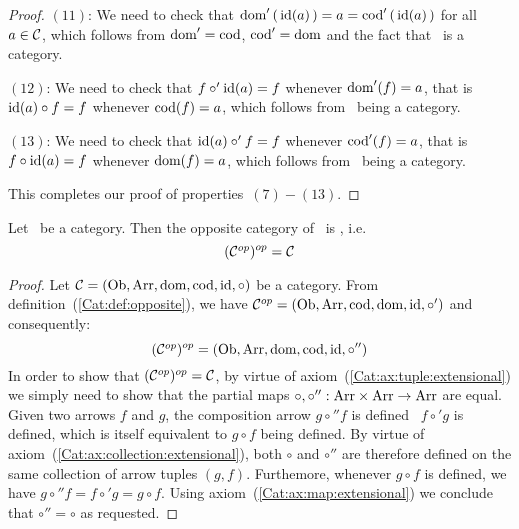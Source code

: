 \begin{proof}
    $(11)$: We need to check that $\mbox{\rm dom}'\,(\,\mbox{\rm id}(a)\,) = a = \mbox{\rm cod}'
    \,(\,\mbox{\rm id}(a)\,)$ for all $a\in\mbox{$\cal C$}$, which follows from $\mbox{\rm dom}'=\mbox{\rm cod}$,
    $\mbox{\rm cod}'=\mbox{\rm dom}$ and the fact that \Cat\ is a category.

    $(12)$: We need to check that $f\circ'\mbox{\rm id}(a)=f$ whenever $\mbox{\rm dom}'(f)=a$,
    that is $\mbox{\rm id}(a)\circ f=f$ whenever $\mbox{\rm cod}(f)=a$, which follows from
    \Cat\ being a category.

    $(13)$: We need to check that $\mbox{\rm id}(a)\circ' f=f$ whenever $\mbox{\rm cod}'(f)=a$,
    that is $f\circ\mbox{\rm id}(a)=f$ whenever $\mbox{\rm dom}(f)=a$, which follows from
    \Cat\ being a category.

    \noindent
    This completes our proof of properties~$(7)-(13)$.
\end{proof}

\begin{prop}
    Let \Cat\ be a category. Then the opposite category of \Cop\ is \Cat, i.e.
        \[
            (\mbox{${\cal C}^{op}$})^{op} = \mbox{$\cal C$}
        \]
\end{prop}
\begin{proof}
    Let $\mbox{$\cal C$}=(\mbox{\rm Ob}, \mbox{\rm Arr}, \mbox{\rm dom},\mbox{\rm cod}, \mbox{\rm id}, \circ)$ be a category. From
    definition~(\ref{Cat:def:opposite}), we have
    $\mbox{${\cal C}^{op}$}=(\mbox{\rm Ob}, \mbox{\rm Arr}, \mbox{\rm cod}, \mbox{\rm dom}, \mbox{\rm id}, \circ')$ and consequently:
        \[
            (\mbox{${\cal C}^{op}$})^{op}=(\mbox{\rm Ob}, \mbox{\rm Arr}, \mbox{\rm dom}, \mbox{\rm cod}, \mbox{\rm id}, \circ'')
        \]
    In order to show that $(\mbox{${\cal C}^{op}$})^{op}=\mbox{$\cal C$}$, by virtue of 
    axiom~(\ref{Cat:ax:tuple:extensional}) we simply need to show that
    the partial maps $\circ,\circ'':\mbox{\rm Arr}\times\mbox{\rm Arr}\to\mbox{\rm Arr}$ are equal.
    Given two arrows $f$ and $g$, the composition arrow $g\circ'' f$ is 
    defined \ifand\ $f\circ' g$ is defined, which is itself equivalent to 
    $g\circ f$ being defined. By virtue of
    axiom~(\ref{Cat:ax:collection:extensional}), both $\circ$ and $\circ''$ 
    are therefore defined on the same collection of arrow tuples $(g,f)$.
    Furthemore, whenever $g\circ f$ is defined, we have 
    $g\circ'' f=f\circ' g=g\circ f$. Using axiom~(\ref{Cat:ax:map:extensional})
    we conclude that $\circ''=\circ$ as requested.
\end{proof}

